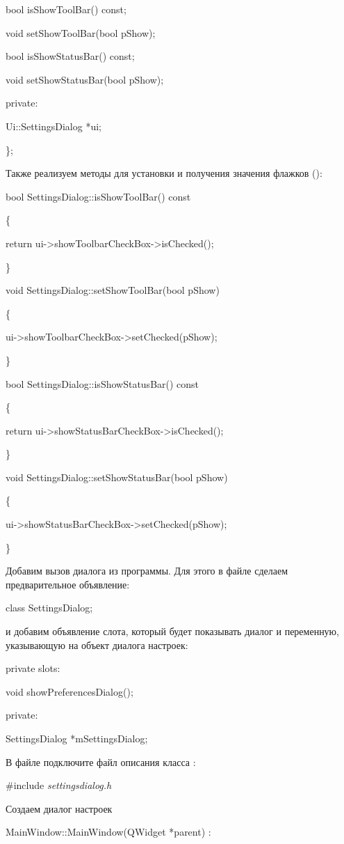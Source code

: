  bool isShowToolBar() const;

 void setShowToolBar(bool pShow);

 bool isShowStatusBar() const;

 void setShowStatusBar(bool pShow);

private:

 Ui::SettingsDialog *ui;

\};

Также реализуем методы для установки и получения значения флажков ():

bool SettingsDialog::isShowToolBar() const

\{

 return ui-{>}showToolbarCheckBox-{>}isChecked();

\}

void SettingsDialog::setShowToolBar(bool pShow)

\{

 ui-{>}showToolbarCheckBox-{>}setChecked(pShow);

\}

bool SettingsDialog::isShowStatusBar() const

\{

 return ui-{>}showStatusBarCheckBox-{>}isChecked();

\}

void SettingsDialog::setShowStatusBar(bool pShow)

\{

 ui-{>}showStatusBarCheckBox-{>}setChecked(pShow);

\}

Добавим вызов диалога из программы. Для этого в файле  сделаем предварительное объявление:

class SettingsDialog;

и добавим объявление слота, который будет показывать диалог и переменную, указывающую на объект диалога настроек: 

private slots:

 void showPreferencesDialog();

private:

 SettingsDialog *mSettingsDialog;

В файле  подключите файл описания класса : 

\#include \textit{settingsdialog.h}

Создаем диалог настроек 

MainWindow::MainWindow(QWidget *parent) :

